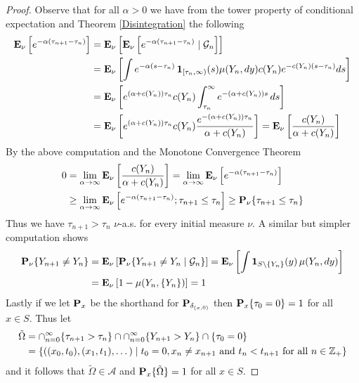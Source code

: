 \begin{proof}
Observe that for all $\alpha > 0$ we have from the tower property of conditional expectation and Theorem \ref{Disintegration} the following
\begin{align*}
\sexpectation{e^{-\alpha (\tau_{n+1} - \tau_n)}}{\nu} &= 
\sexpectation{\csexpectationlong{\mathcal{G}_n}{ e^{-\alpha (\tau_{n+1} - \tau_n)} }{\nu} }{\nu} \\
&=\sexpectation{\int e^{-\alpha (s - \tau_n) } \, \characteristic{[\tau_n,\infty)}(s) \mu(Y_n, dy) c(Y_n) e^{-c(Y_n)(s - \tau_n)} ds} {\nu} \\
&=\sexpectation{e^{(\alpha + c(Y_n)) \tau_n} c(Y_n) \int_{\tau_n}^\infty e^{-(\alpha +c(Y_n)) s} \, ds}{\nu}\\
&=\sexpectation{e^{(\alpha + c(Y_n)) \tau_n} c(Y_n) \frac{e^{-(\alpha + c(Y_n)) \tau_n}}{\alpha +c(Y_n)} }{\nu} = \sexpectation{\frac{c(Y_n) }{\alpha +c(Y_n)} }{\nu} \\
\end{align*}
By the above computation and the Monotone Convergence Theorem
\begin{align*}
0 &= \lim_{\alpha \to \infty} \sexpectation{\frac{c(Y_n) }{\alpha +c(Y_n)} }{\nu}  = \lim_{\alpha \to \infty} \sexpectation{e^{-\alpha (\tau_{n+1} - \tau_n)}}{\nu} \\
&\geq \lim_{\alpha \to \infty} \sexpectation{e^{-\alpha (\tau_{n+1} - \tau_n)} ; \tau_{n+1} \leq \tau_n }{\nu} \geq \sprobability{\tau_{n+1} \leq \tau_n }{\nu} 
\end{align*}
Thus we have $\tau_{n+1} > \tau_n$ $\nu$-a.s. for every initial measure $\nu$.  A similar but simpler computation shows
\begin{align*}
\sprobability{Y_{n+1} \neq Y_n} {\nu} &= 
\sexpectation{
\csprobability{\mathcal{G}_n}{Y_{n+1} \neq Y_n }{\nu} }{\nu}
=\sexpectation{
\int \characteristic{S \setminus \lbrace Y_n \rbrace}(y) \, \mu(Y_n , dy) 
}{\nu}  \\
&= \sexpectation{1 - \mu(Y_n, \lbrace Y_n \rbrace)}{\nu} = 1
\end{align*}
Lastly if we let $\probabilityop_x$ be the shorthand for $\probabilityop_{\delta_{(x,0)}}$ then
$\sprobability{\tau_0 = 0} {x} =1$ for all $x \in S$.  Thus let 
\begin{align*}
\tilde{\Omega} &= \cap_{n=0}^\infty \lbrace \tau_{n+1} > \tau_n \rbrace \cap \cap_{n=0}^\infty \lbrace Y_{n+1} > Y_n \rbrace \cap \lbrace \tau_0 = 0 \rbrace \\
&= \lbrace ((x_0, t_0), (x_1, t_1), \dotsc ) \mid t_0 =0, x_n \neq x_{n+1} \text{ and } t_n < t_{n+1} \text{ for all } n \in \integers_+ \rbrace
\end{align*}
and it follows that $\tilde{\Omega} \in \mathcal{A}$ and $\sprobability{\tilde{\Omega}}{x} = 1$ for all $x\in S$.


\end{proof}
